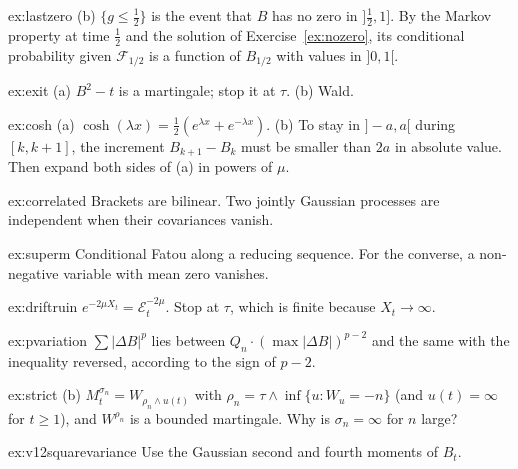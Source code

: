 \begin{hint}{ex:lastzero}
(b) $\{g\le\frac12\}$ is the event that $B$ has no zero in $]\frac12,1]$. By the Markov property at time $\frac12$ and the solution of Exercise~\ref{ex:nozero}, its conditional probability given $\mathcal F_{1/2}$ is a function of
$B_{1/2}$ with values in $]0,1[$.
\end{hint}

\begin{hint}{ex:exit}
(a) $B^2-t$ is a martingale; stop it at $\tau$. (b) Wald.
\end{hint}

\begin{hint}{ex:cosh}
(a) $\cosh(\lambda x)=\frac12(e^{\lambda x}+e^{-\lambda x})$. (b) To stay in $]-a,a[$ during $[k,k+1]$, the increment $B_{k+1}-B_k$ must be smaller than $2a$ in absolute value. Then expand both sides of (a) in powers of $\mu$.
\end{hint}

\begin{hint}{ex:correlated}
Brackets are bilinear. Two jointly Gaussian processes are independent when their covariances vanish.
\end{hint}

\begin{hint}{ex:superm}
Conditional Fatou along a reducing sequence. For the converse, a non-negative variable with mean zero vanishes.
\end{hint}

\begin{hint}{ex:driftruin}
$e^{-2\mu X_t}=\mathcal E^{-2\mu}_t$. Stop at $\tau$, which is finite because $X_t\to\infty$.
\end{hint}

\begin{hint}{ex:pvariation}
$\sum|\Delta B|^p$ lies between $Q_n\cdot(\max|\Delta B|)^{p-2}$ and the same with the inequality reversed, according to the sign of $p-2$.
\end{hint}

\begin{hint}{ex:strict}
(b) $M^{\sigma_n}_t=W_{\rho_n\wedge u(t)}$ with $\rho_n=\tau\wedge\inf\{u:W_u=-n\}$ (and $u(t)=\infty$ for $t\ge1$), and $W^{\rho_n}$ is a bounded martingale. Why is $\sigma_n=\infty$ for $n$ large?
\end{hint}

\begin{hint}{ex:v12squarevariance}
Use the Gaussian second and fourth moments of $B_t$.
\end{hint}

